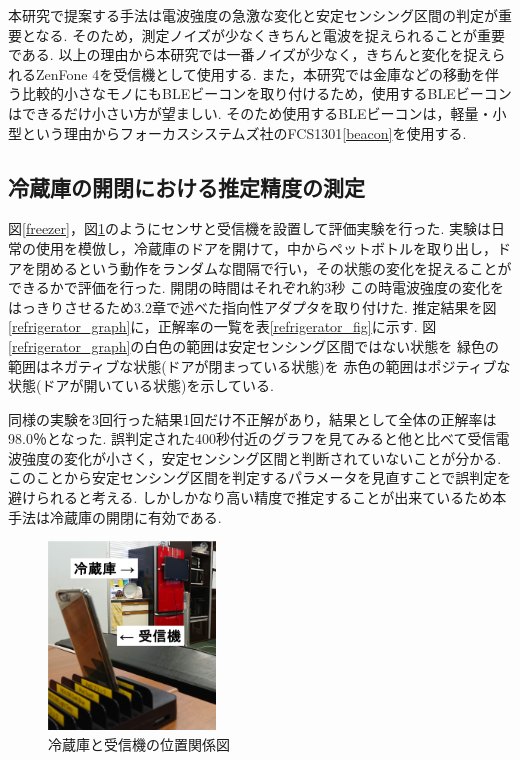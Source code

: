 \documentclass[Japanese]{dicomopapers}
\begin{document}
本研究で提案する手法は電波強度の急激な変化と安定センシング区間の判定が重要となる.
そのため，測定ノイズが少なくきちんと電波を捉えられることが重要である.
以上の理由から本研究では一番ノイズが少なく，きちんと変化を捉えられるZenFone 4を受信機として使用する.
また，本研究では金庫などの移動を伴う比較的小さなモノにもBLEビーコンを取り付けるため，使用するBLEビーコンはできるだけ小さい方が望ましい.
そのため使用するBLEビーコンは，軽量・小型という理由からフォーカスシステムズ社のFCS1301\ref{beacon}を使用する.


\subsection{冷蔵庫の開閉における推定精度の測定}
図\ref{freezer}，図\ref{refrigerator_position}のようにセンサと受信機を設置して評価実験を行った.
実験は日常の使用を模倣し，冷蔵庫のドアを開けて，中からペットボトルを取り出し，ドアを閉めるという動作をランダムな間隔で行い，その状態の変化を捉えることができるかで評価を行った.
開閉の時間はそれぞれ約3秒
この時電波強度の変化をはっきりさせるため3.2章で述べた指向性アダプタを取り付けた.
推定結果を図\ref{refrigerator_graph}に，正解率の一覧を表\ref{refrigerator_fig}に示す.
図\ref{refrigerator_graph}の白色の範囲は安定センシング区間ではない状態を 緑色の範囲はネガティブな状態(ドアが閉まっている状態)を 赤色の範囲はポジティブな状態(ドアが開いている状態)を示している.

同様の実験を3回行った結果1回だけ不正解があり，結果として全体の正解率は98.0％となった.
誤判定された400秒付近のグラフを見てみると他と比べて受信電波強度の変化が小さく，安定センシング区間と判断されていないことが分かる.
このことから安定センシング区間を判定するパラメータを見直すことで誤判定を避けられると考える.
しかしかなり高い精度で推定することが出来ているため本手法は冷蔵庫の開閉に有効である.


\begin{figure}[ht]
    \centering
    \includegraphics[height=5cm]{refrigerator_position.png}
    \caption{冷蔵庫と受信機の位置関係図}
    \label{refrigerator_position}
\end{figure}
\end{document}
